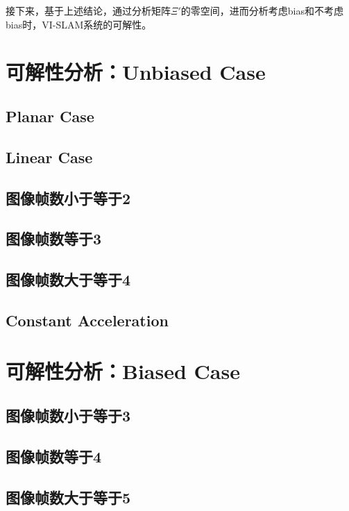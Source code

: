 \documentclass{article}
\begin{document}
\par
接下来，基于上述结论，通过分析矩阵$\Xi'$的零空间，进而分析考虑bias和不考虑bias时，VI-SLAM系统的可解性。

\section{可解性分析：Unbiased Case}
\subsection{Planar Case}

\subsection{Linear Case}

\subsection{图像帧数小于等于2}

\subsection{图像帧数等于3}

\subsection{图像帧数大于等于4}

\subsection{Constant Acceleration}

\section{可解性分析：Biased Case}
\subsection{图像帧数小于等于3}

\subsection{图像帧数等于4}

\subsection{图像帧数大于等于5}
\end{document}
